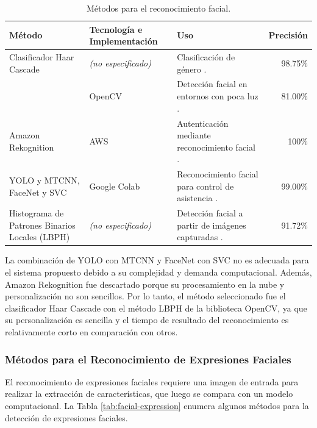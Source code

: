 \documentclass[a4paper,fleqn]{cas-sc}
\begin{document}
	\begin{table}[h]
		\caption{Métodos para el reconocimiento facial.}
		\label{tab:facial-recognition}
		\centering
		\begin{tabular}{p{}p{}p{}p{}}
			\hline
			\multicolumn{1}{l}{\textbf{Método}} & \multicolumn{1}{l}{\textbf{Tecnología e Implementación}} & \multicolumn{1}{l}{\textbf{Uso}} & \multicolumn{1}{l}{\textbf{Precisión}} \\ \hline
			Clasificador Haar Cascade & \textit{(no especificado)} & Clasificación de género \citep{Priyanka2012Hybrid}. & \multicolumn{1}{r}{98.75\%} \\
			& OpenCV & Detección facial en entornos con poca luz \citep{Le2022Facial}. & \multicolumn{1}{r}{81.00\%} \\
			Amazon Rekognition & AWS & Autenticación mediante reconocimiento facial \citep{Girmay2021AI}. & \multicolumn{1}{r}{100\%} \\
			YOLO y MTCNN, FaceNet y SVC & Google Colab & Reconocimiento facial para control de asistencia \citep{Darapaneni2020Automatic}. & \multicolumn{1}{r}{99.00\%} \\
			Histograma de Patrones Binarios Locales (LBPH) & \textit{(no especificado)} & Detección facial a partir de imágenes capturadas \citep{Garcia2021Application}. & \multicolumn{1}{r}{91.72\%} \\ \hline
		\end{tabular}
	\end{table}
	La combinación de YOLO con MTCNN y FaceNet con SVC no es adecuada para el sistema propuesto debido a su complejidad y demanda computacional. Además, Amazon Rekognition fue descartado porque su procesamiento en la nube y personalización no son sencillos. Por lo tanto, el método seleccionado fue el clasificador Haar Cascade con el método LBPH de la biblioteca OpenCV, ya que su personalización es sencilla y el tiempo de resultado del reconocimiento es relativamente corto en comparación con otros.
	
	\subsubsection*{Métodos para el Reconocimiento de Expresiones Faciales}				
	El reconocimiento de expresiones faciales requiere una imagen de entrada para realizar la extracción de características, que luego se compara con un modelo computacional. La Tabla \ref{tab:facial-expression} enumera algunos métodos para la detección de expresiones faciales.
	
\end{document}
